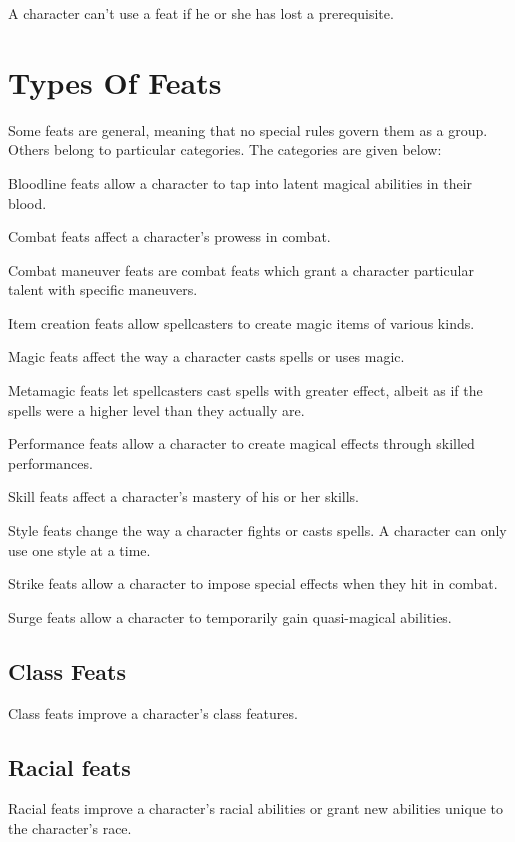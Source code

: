 A character can't use a feat if he or she has lost a prerequisite.

\section{Types Of Feats}
Some feats are general, meaning that no special rules govern
them as a group. Others belong to particular categories. The categories are given below:
\begin{itemize*}
\item Bloodline feats allow a character to tap into latent magical abilities in their blood.
\item Combat feats affect a character's prowess in combat.
\item Combat maneuver feats are combat feats which grant a character particular talent with specific maneuvers.
\item Item creation feats allow spellcasters to create magic items of various kinds.
\item Magic feats affect the way a character casts spells or uses magic.
\item Metamagic feats let spellcasters cast spells with greater effect, albeit as if the spells were a higher level than they actually are.
\item Performance feats allow a character to create magical effects through skilled performances.
\item Skill feats affect a character's mastery of his or her skills.
\item Style feats change the way a character fights or casts spells. A character can only use one style at a time.
\item Strike feats allow a character to impose special effects when they hit in combat.
\item Surge feats allow a character to temporarily gain quasi-magical abilities.
\end{itemize*}

\subsection{Class Feats}
Class feats improve a character's class features.

\subsection{Racial feats}
Racial feats improve a character's racial abilities or grant new abilities unique to the character's race.


